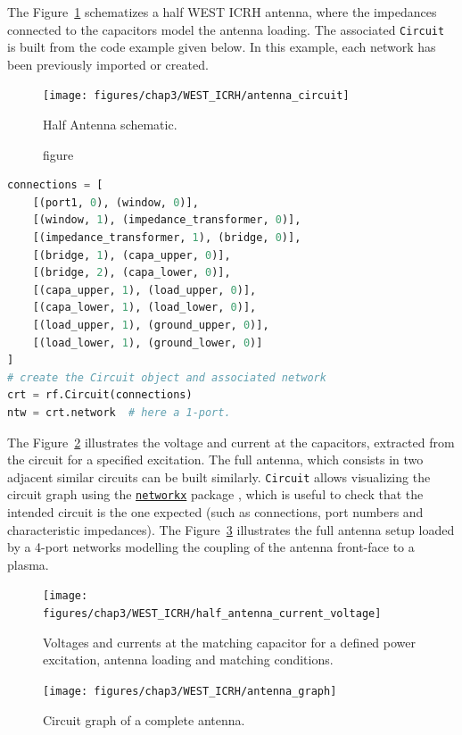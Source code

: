 {The Figure~\ref{fig:antenna_circuit} schematizes a half WEST ICRH antenna, where the impedances connected to the capacitors model the antenna loading. The associated \texttt{Circuit} is built from the code example given below. In this example, each network has been previously imported or created. 

\begin{figure}
	\centering
	\texttt{[image: figures/chap3/WEST\_ICRH/antenna\_circuit]}
	\caption{figure}{Half Antenna schematic.}
	\label{fig:antenna_circuit}
\end{figure}

\begin{lstlisting}[language=Python, basicstyle=\footnotesize]
connections = [
	[(port1, 0), (window, 0)],
	[(window, 1), (impedance_transformer, 0)],
	[(impedance_transformer, 1), (bridge, 0)],
	[(bridge, 1), (capa_upper, 0)],
	[(bridge, 2), (capa_lower, 0)],
	[(capa_upper, 1), (load_upper, 0)],
	[(capa_lower, 1), (load_lower, 0)],
	[(load_upper, 1), (ground_upper, 0)],
	[(load_lower, 1), (ground_lower, 0)]
]
# create the Circuit object and associated network
crt = rf.Circuit(connections) 
ntw = crt.network  # here a 1-port.			
\end{lstlisting}

The Figure~\ref{fig:halfantennacurrentvoltage} illustrates the voltage and current at the capacitors, extracted from the circuit for a specified excitation. The full antenna, which consists in two adjacent similar circuits can be built similarly. \texttt{Circuit} allows visualizing the circuit graph using the \href{https://networkx.github.io/}{\texttt{networkx}} package , which is useful to check that the intended circuit is the one expected (such as connections, port numbers and characteristic impedances). The Figure~\ref{fig:antenna_graph} illustrates the full antenna setup loaded by a 4-port networks modelling the coupling of the antenna front-face to a plasma.

\begin{figure}
	\centering
	\texttt{[image: figures/chap3/WEST\_ICRH/half\_antenna\_current\_voltage]}
	\caption{Voltages and currents at the matching capacitor for a defined power excitation, antenna loading and matching conditions.}
	\label{fig:halfantennacurrentvoltage}
\end{figure}

\begin{figure}
	\centering
	\texttt{[image: figures/chap3/WEST\_ICRH/antenna\_graph]}
	\caption{Circuit graph of a complete antenna.}
	\label{fig:antenna_graph}
\end{figure}


}
